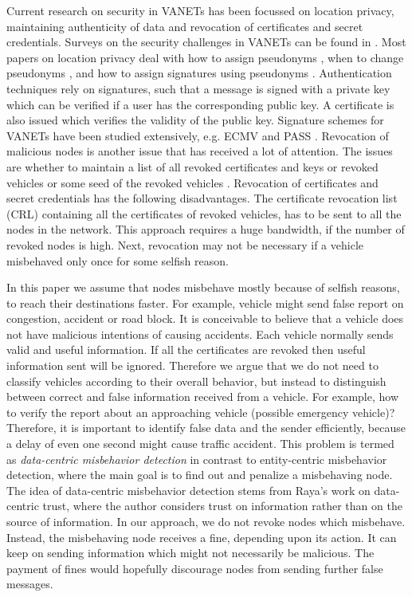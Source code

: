 \documentclass[conference]{IEEEtran}[10pt]
\begin{document}
Current research on security in VANETs has been focussed on location privacy, maintaining authenticity of data and revocation of certificates and
secret credentials.
Surveys on the security challenges in VANETs can be found in \cite{PBHSFRMKKH08,KPBMSWTCHKH08,PP05,BHM10}. 
Most papers on location privacy deal with how  to assign pseudonyms \cite{R09}, when to change pseudonyms \cite{R09,SLHP07,FMBH10,BHV07}, and
how to assign signatures using pseudonyms \cite{SLLSS10}. 
Authentication techniques rely on signatures, such that a message is signed with a private key which can be verified 
if a user has the corresponding public key.
A certificate is also issued which verifies the validity of the public key.  
Signature schemes for VANETs have been studied extensively, e.g. ECMV \cite{WJS08} and PASS \cite{SLLSS10}. 
Revocation of malicious nodes is another issue that has received a lot of attention. 
The issues are whether to maintain a list of all revoked certificates and keys or revoked vehicles or some seed of the revoked vehicles \cite{SLLSS10}.   
Revocation of certificates and secret credentials has the following disadvantages.
The certificate revocation list (CRL) containing all the certificates of revoked vehicles,  
has to be sent to all the nodes in the network.
This approach requires a huge bandwidth, if the number of revoked nodes is high. 
Next, revocation may not be necessary if a vehicle misbehaved only once for some selfish reason. 


In this paper we assume that nodes misbehave mostly because of selfish reasons, to reach their destinations faster.
For example, vehicle might send false report on congestion, accident or road block. 
It is conceivable to believe that a vehicle does not have malicious intentions of causing accidents.
Each vehicle normally sends valid and useful information.
If all the certificates are revoked then useful information sent will be ignored. 
Therefore we argue that we do not need to classify vehicles according to their overall behavior, but instead to distinguish between correct and false information received from a vehicle. 
For example, how to verify the report about an approaching vehicle (possible emergency vehicle)? 
Therefore, it is important to identify false data and the sender efficiently, because a delay of even one second might cause traffic accident. 
This problem is termed as \emph{data-centric misbehavior detection} in contrast to entity-centric misbehavior detection, where the main goal is to find out and penalize a misbehaving node.
The idea of data-centric misbehavior detection stems from Raya's work \cite{R09} on data-centric trust, where the author considers trust on information
rather than on the source of information. 
In our approach, we do not revoke nodes which misbehave. Instead,
the misbehaving node receives a fine, depending upon its action. 
It can keep on sending information which might not necessarily be malicious. 
The payment of fines would hopefully discourage nodes from sending further false messages. 
\end{document}
